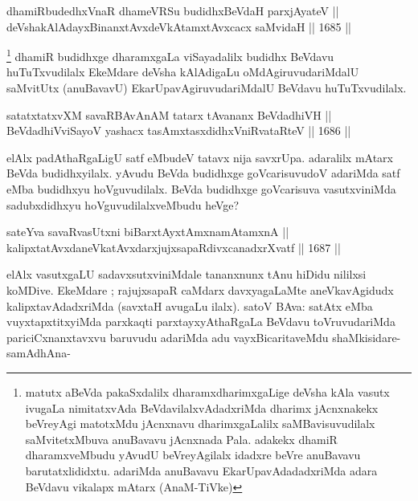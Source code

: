 
\begin{shl}
dhamiRbudedhxVnaR dhameVRSu budidhxBeVdaH parxjAyateV || \\
deVshakAlAdayxBinanxtAvxdeVkAtamxtAvxcacx saMvidaH \hfill || 1685 ||  
\end{shl}

\begin{artha}
\footnote{matutx aBeVda pakaSxdalilx dharamxdharimxgaLige deVsha kAla vasutx ivugaLa nimitatxvAda BeVdavilalxvAdadxriMda dharimx jAcnxnakekx beVreyAgi matotxMdu jAcnxnavu dharimxgaLalilx saMBavisuvudilalx saMvitetxMbuva anuBavavu jAcnxnada Pala. adakekx dhamiR dharamxveMbudu yAvudU beVreyAgilalx idadxre beVre anuBavavu barutatxlididxtu. adariMda anuBavavu EkarUpavAdadadxriMda adara BeVdavu vikalapx mAtarx (AnaM-TiVke)}
dhamiR budidhxge dharamxgaLa viSayadalilx budidhx BeVdavu huTuTxvudilalx EkeMdare deVsha kAlAdigaLu oMdAgiruvudariMdalU saMvitUtx (anuBavavU) EkarUpavAgiruvudariMdalU BeVdavu huTuTxvudilalx.
\end{artha}


\begin{shl}
satatxtatxvXM savaRBAvAnAM tatarx tAvananx BeVdadhiVH || \\
BeVdadhiVviSayoV yashacx tasAmxtasxdidhxVniRvataRteV \hfill || 1686 ||  
\end{shl}

\begin{artha}
elAlx padAthaRgaLigU satf eMbudeV tatavx nija savxrUpa. adaralilx mAtarx BeVda budidhxyilalx. yAvudu BeVda budidhxge goVcarisuvudoV adariMda satf eMba budidhxyu hoVguvudilalx. BeVda budidhxge goVcarisuva vasutxviniMda sadubxdidhxyu hoVguvudilalxveMbudu heVge?
\end{artha}

\begin{shl}
sateYva savaRvasUtxni biBarxtAyxtAmxnamAtamxnA || \\
kalipxtatAvxdaneVkatAvxdarxjujxsapaRdivxcanadxrXvatf \hfill || 1687 ||  
\end{shl}

\begin{artha}
elAlx vasutxgaLU sadavxsutxviniMdale tananxnunx tAnu hiDidu nililxsi koMDive. EkeMdare ; rajujxsapaR caMdarx davxyagaLaMte aneVkavAgidudx kalipxtavAdadxriMda (savxtaH avugaLu ilalx). satoV BAva: satAtx eMba vuyxtapxtitxyiMda parxkaqti parxtayxyAthaRgaLa BeVdavu toVruvudariMda pariciCxnanxtavxvu baruvudu adariMda adu vayxBicaritaveMdu shaMkisidare- samAdhAna-
\end{artha}


